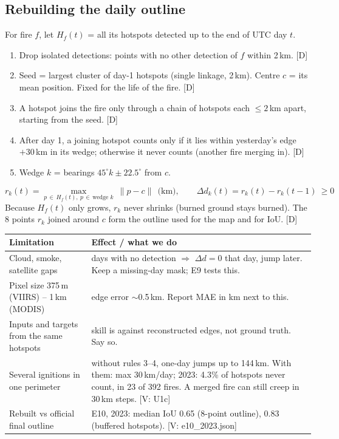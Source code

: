 \documentclass[11pt,a4paper]{article}
\newcommand{\tagbox}[2]{{\footnotesize\color{#1}\textsf{[#2]}}}
\newcommand{\veri}[1]{\tagbox{ForestGreen!70!black}{V: #1}}  %
\newcommand{\ours}{\tagbox{NavyBlue}{D}}                      %
\begin{document}
\subsection{Rebuilding the daily outline}
For fire $f$, let $H_f(t)$ = all its hotspots detected up to the end of UTC day $t$.
\begin{enumerate}
\item Drop isolated detections: points with no other detection of $f$ within 2\,km. \ours
\item Seed = largest cluster of day-1 hotspots (single linkage, 2\,km). Centre $c$ = its mean position. Fixed for the
  life of the fire. \ours
\item A hotspot joins the fire only through a chain of hotspots each $\le2$\,km apart, starting from the seed. \ours
\item After day 1, a joining hotspot counts only if it lies within yesterday's edge $+30$\,km in its wedge;
  otherwise it never counts (another fire merging in). \ours
\item Wedge $k$ = bearings $45^\circ k\pm22.5^\circ$ from $c$.
\end{enumerate}
\[
r_k(t)=\max_{p\,\in\,H_f(t),\ p\,\in\,\text{wedge }k}\ \lVert p-c\rVert\ \ \text{(km)},
\qquad
\Delta d_k(t)=r_k(t)-r_k(t-1)\ \ge 0
\]
Because $H_f(t)$ only grows, $r_k$ never shrinks (burned ground stays burned). The 8 points $r_k$ joined around $c$
form the outline used for the map and for IoU. \ours

\begin{center}\small
\begin{tabularx}{\linewidth}{@{}l Y@{}}
\toprule
\textbf{Limitation} & \textbf{Effect / what we do}\\
\midrule
Cloud, smoke, satellite gaps & days with no detection $\Rightarrow$ $\Delta d=0$ that day, jump later. Keep a
missing-day mask; E9 tests this.\\
Pixel size 375\,m (VIIRS) -- 1\,km (MODIS) & edge error $\sim$0.5\,km. Report MAE in km next to this.\\
Inputs and targets from the same hotspots & skill is against reconstructed edges, not ground truth. Say so.\\
Several ignitions in one perimeter & without rules 3--4, one-day jumps up to 144\,km. With them: max 30\,km/day;
2023: 4.3\% of hotspots never count, in 23 of 392 fires. A merged fire can still creep in 30\,km steps. \veri{U1c}\\
Rebuilt vs official final outline & E10, 2023: median IoU 0.65 (8-point outline), 0.83 (buffered hotspots).
\veri{e10\_2023.json}\\
\bottomrule
\end{tabularx}
\end{center}
\end{document}
